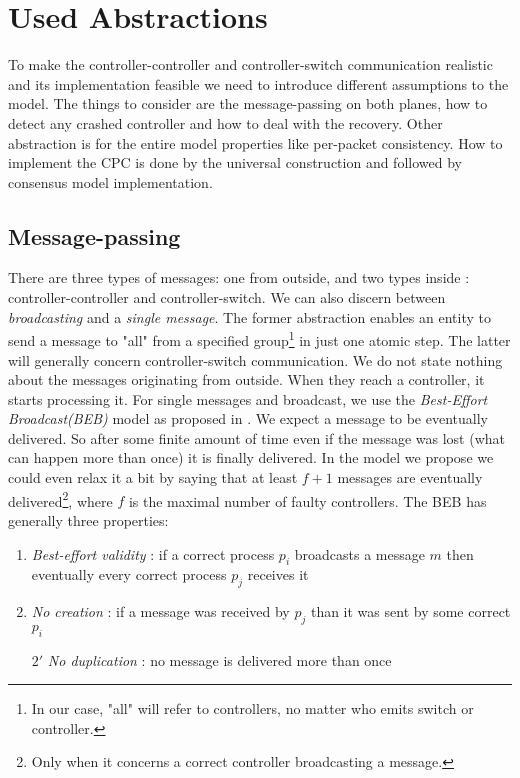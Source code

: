 \documentclass{article}
\theoremstyle{remark}
\begin{document}
\section{Used Abstractions}
To make the controller-controller and controller-switch communication realistic and its implementation feasible we need to introduce different assumptions to the model. The things to consider are the message-passing on both planes, how to detect any crashed controller and how to deal with the recovery. Other abstraction is for the entire model properties like per-packet consistency. How to implement the CPC is done by the universal construction and followed by consensus model implementation. 

\subsection{Message-passing}
There are three types of messages: one from outside, and two types inside : controller-controller and controller-switch. We can also discern between \emph{broadcasting} and a \emph{single message}. The former abstraction enables an entity to send a message to "all" from a specified group\footnote{In our case, "all" will refer to controllers, no matter who emits switch or controller.} in just one atomic step. The latter will generally concern controller-switch communication. 
We do not state nothing about the messages originating from outside. When they reach a controller, it starts processing it. For single messages and broadcast, we use the \emph{Best-Effort Broadcast(BEB)} model as proposed in \cite{Guerraoui:2010:IRD:1951643}. We expect a message to be eventually delivered. So after some finite amount of time even if the message was lost (what can happen more than once) it is finally delivered. In the model we propose we could even relax it a bit by saying that at least $f+1$ messages are eventually delivered\footnote{Only when it concerns a correct controller broadcasting a message.}, where $f$ is the maximal number of faulty controllers. 
The BEB has generally three properties:
\begin{enumerate}
\item \emph{Best-effort validity} : if a correct process $p_i$ broadcasts a message $m$ then eventually every correct process $p_j$ receives it
\item \emph{No creation} : if a message was received by $p_j$ than it was sent by some correct $p_i$
\item[$2'$] \emph{No duplication} : no message is delivered more than once
\end{enumerate}
\end{document}
